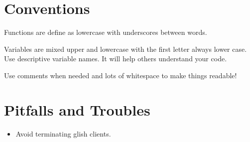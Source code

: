 \section{Conventions}

Functions are define as lowercase with underscores between words.

Variables are mixed upper and lowercase with the first letter always lower
case.
Use descriptive variable names.  It will help others understand your code.

Use comments when needed and lots of whitespace to make things readable!

\section{Pitfalls and Troubles}

\begin{itemize}
\item Avoid terminating glish clients.
\end{itemize}

